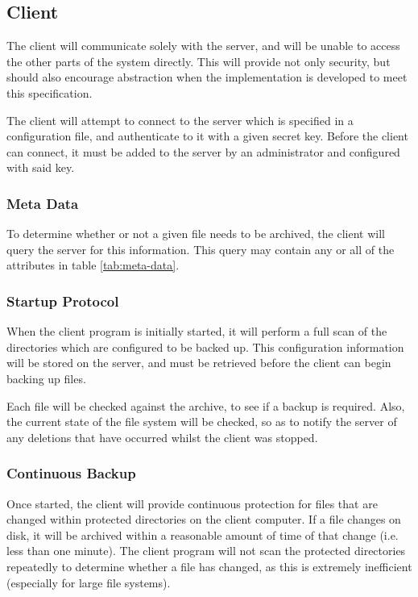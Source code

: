 \subsection{Client}

The client will communicate solely with the server, and will be unable to
access the other parts of the system directly. This will provide not only
security, but should also encourage abstraction when the implementation is
developed to meet this specification.

The client will attempt to connect to the server which is specified in
a configuration file, and authenticate to it with a given secret key. Before
the client can connect, it must be added to the server by an administrator and
configured with said key.

\subsubsection{Meta Data}

To determine whether or not a given file needs to be archived, the client will
query the server for this information. This query may contain any or all of the
attributes in table \ref{tab:meta-data}.

\subsubsection{Startup Protocol}

When the client program is initially started, it will perform a full scan of
the directories which are configured to be backed up. This configuration
information will be stored on the server, and must be retrieved before the
client can begin backing up files.

Each file will be checked against the archive, to see if a backup is required.
Also, the current state of the file system will be checked, so as to notify the
server of any deletions that have occurred whilst the client was stopped.

\subsubsection{Continuous Backup}

Once started, the client will provide continuous protection for files that are
changed within protected directories on the client computer. If a file changes
on disk, it will be archived within a reasonable amount of time of that change
(i.e. less than one minute). The client program will not scan the protected
directories repeatedly to determine whether a file has changed, as this is
extremely inefficient (especially for large file systems).

